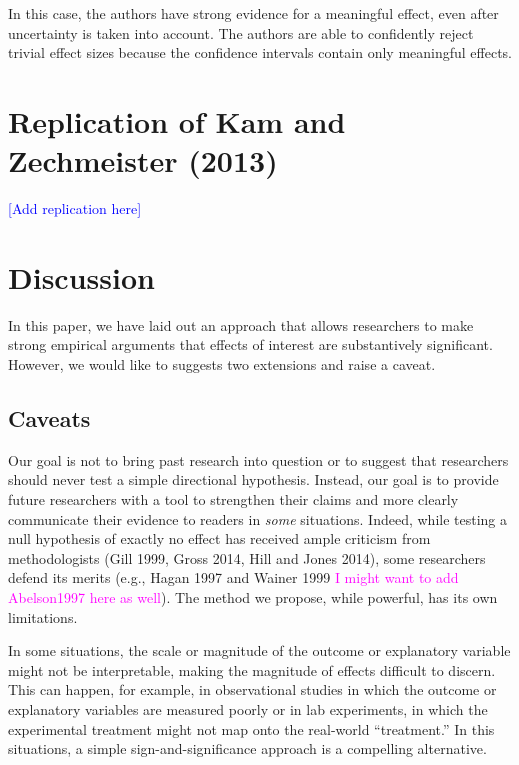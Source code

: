 \documentclass[12pt]{article}
\newcommand{\kelly}[1]{\textcolor{blue}{#1}}
\newcommand{\carlisle}[1]{\textcolor{magenta}{#1}}
\begin{document}
In this case, the authors have strong evidence for a meaningful effect, even after uncertainty is taken into account. The authors are able to confidently reject trivial effect sizes because the confidence intervals contain only meaningful effects.


\section*{Replication of Kam and Zechmeister (2013)}

\kelly{[Add replication here]}

\section*{Discussion}

In this paper, we have laid out an approach that allows researchers to make strong empirical arguments that effects of interest are substantively significant. However, we would like to suggests two extensions and raise a caveat.

\subsection*{Caveats}

Our goal is not to bring past research into question or to suggest that researchers should never test a simple directional hypothesis. Instead, our goal is to provide future researchers with a tool to strengthen their claims and more clearly communicate their evidence to readers in \textit{some} situations. Indeed, while testing a null hypothesis of exactly no effect has received ample criticism from methodologists (Gill 1999, Gross 2014, Hill and Jones 2014), some researchers defend its merits (e.g., Hagan 1997 and Wainer 1999 \carlisle{I might want to add Abelson1997 here as well}). The method we propose, while powerful, has its own limitations.

In some situations, the scale or magnitude of the outcome or explanatory variable might not be interpretable, making the magnitude of effects difficult to discern. This can happen, for example, in observational studies in which the outcome or explanatory variables are measured poorly or in lab experiments, in which the experimental treatment might not map onto the real-world ``treatment.'' In this situations, a simple sign-and-significance approach is a compelling alternative.
\end{document}
